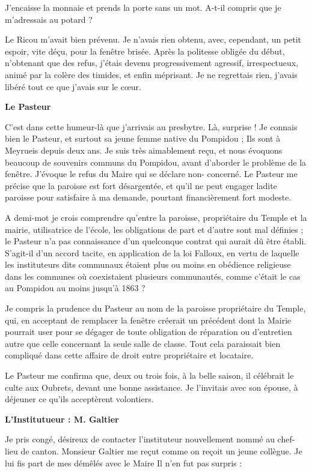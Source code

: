 J’encaisse la monnaie et prends la porte sans un mot. A-t-il compris que je m’adressais au
potard ?

Le Ricou m’avait bien prévenu. Je n’avais rien obtenu, avec, cependant, un petit espoir, vite
déçu, pour la fenêtre brisée. Après la politesse obligée du début, n’obtenant que des refus,
j’étais devenu progressivement agressif, irrespectueux, animé par la colère des timides, et
enfin méprisant. Je ne regrettais rien, j’avais libéré tout ce que j’avais sur le cœur.

\textbf{Le Pasteur}

C’est dans cette humeur-là que j’arrivais au presbytre. Là, surprise ! Je connais bien le Pasteur,
et surtout sa jeune femme native du Pompidou ; Ils sont à Meyrueis depuis deux ans. Je suis
très aimablement reçu, et nous évoquons beaucoup de souvenirs communs du Pompidou,
avant d’aborder le problème de la fenêtre. J’évoque le refus du Maire qui se déclare non-
concerné. Le Pasteur me précise que la paroisse est fort désargentée, et qu’il ne peut engager
ladite paroisse pour satisfaire à ma demande, pourtant financièrement fort modeste.

A demi-mot je crois comprendre qu’entre la paroisse, propriétaire du Temple et la mairie,
utilisatrice de l’école, les obligations de part et d’autre sont mal définies ; le Pasteur n’a pas
connaissance d’un quelconque contrat qui aurait dû être établi. S’agit-il d’un accord tacite, en
application de la loi Falloux, en vertu de laquelle les instituteurs dits communaux étaient plus
ou moins en obédience religieuse dans les communes où coexistaient plusieurs communautés,
comme c’était le cas au Pompidou au moins jusqu’à 1863 ?

Je compris la prudence du Pasteur au nom de la paroisse propriétaire du Temple, qui, en
acceptant de remplacer la fenêtre créerait un précédent dont la Mairie pourrait user pour se
dégager de toute obligation de réparation ou d’entretien autre que celle concernant la seule
salle de classe. Tout cela paraissait bien compliqué dans cette affaire de droit entre propriétaire
et locataire.

Le Pasteur me confirma que, deux ou trois fois, à la belle saison, il célébrait le culte aux
Oubrets, devant une bonne assistance. Je l’invitais avec son épouse, à déjeuner ce qu’ils
acceptèrent volontiers.

\textbf{L’Institutueur : M. Galtier}

Je pris congé, désireux de contacter l’instituteur nouvellement nommé au chef-lieu de canton.
Monsieur Galtier me reçut comme on reçoit un jeune collègue. Je lui fis part de mes démêlés
avec le Maire Il n’en fut pas surpris :

